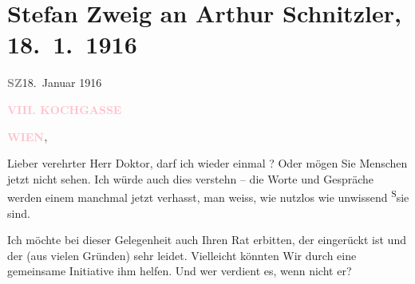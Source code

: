 

\renewcommand{\erwaehntePersonen}{Personen: Rainer Maria Rilke, Olga Schnitzler, Stefan Zweig}
\renewcommand{\erwaehnteInstitutionen}{Institutionen: Kriegsarchiv}
\renewcommand{\erwaehnteOrte}{Orte: Kochgasse 8, Wien}
\renewcommand{\erwaehnteWerke}{}
\section[Stefan Zweig an Arthur Schnitzler, 18. 1. 1916]{Stefan Zweig an Arthur Schnitzler, 18. 1. 1916}
\nopagebreak{}
\rehead{ }\normalsize\beginnumbering{}
\toendnotes[C]{\smallbreak\pagebreak[2]}
\toendnotes[C]{\smallbreak}
\pstart
           {\pb}\textcolor{gray}{\textbf{SZ}}\hfill 18. Januar 1916\pend
           
\pstart
           \raggedleft{}\textcolor{gray}{\textbf{\textcolor{pink}{VIII. KOCHGASSE}{}\ledrightnote{\textcolor{pink}{Kochgasse 8}}}}\pend
           
\pstart
           \raggedleft{}\textcolor{gray}{\textbf{\textcolor{pink}{WIEN}{}\ledrightnote{\textcolor{pink}{Wien}},}}\pend
           
\pstart{}Lieber verehrter Herr Doktor,\pend
\pstart
           darf ich wieder einmal \label{K_L03657-1v}\label{K_L03657-1h}? Oder
               mögen Sie Menschen jetzt nicht sehen. Ich würde auch dies verstehn – die Worte und
               Gespräche werden einem manchmal jetzt verhasst, man weiss, wie nutzlos wie unwissend \substVorne{}\textsuperscript{S}\substDazwischen{}s\substHinten{}ie sind.\pend
           
\pstart
           Ich möchte bei dieser Gelegenheit auch Ihren Rat \label{K_L03657-2v}\label{K_L03657-2h} erbitten, der eingerückt ist und der (aus
               vielen Gründen) sehr leidet. Vielleicht könnten Wir durch eine gemeinsame Initiative
               ihm helfen. Und {\pb}wer verdient es, wenn
               nicht er?\pend
           
